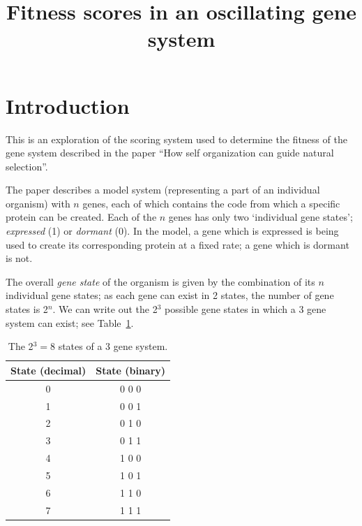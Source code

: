 \documentclass[11pt, a4paper]{article}
\title {
  Fitness scores in an oscillating gene system
}
\date{} %
\author{\Authors}
\begin{document}
\setlength{\droptitle}{-1.8cm} %
\maketitle

\vspace{-1.8cm} %

\section{Introduction}

This is an exploration of the scoring system used to determine the
fitness of the gene system described in the paper ``How self
organization can guide natural selection''.

The paper describes a model system (representing a part of an
individual organism) with $n$ genes, each of which contains the code
from which a specific protein can be created. Each of the $n$ genes
has only two `individual gene states'; \emph{expressed} (1)
or \emph{dormant} (0). In the model, a gene which is expressed is
being used to create its corresponding protein at a fixed rate; a gene
which is dormant is not.

The overall \emph{gene state} of the organism is given by the
combination of its $n$ individual gene states; as each gene can exist
in 2 states, the number of gene states is 2$^n$. We can write out the 2$^3$
possible gene states in which a 3 gene system can exist; see
Table~\ref{tab:states}.

\begin{table}[h!]
  \begin{center}
    \caption{The 2$^3 = \mathrm{8}$ states of a 3 gene system.}
    \label{tab:states}
    \begin{tabular}{c|c}
      \textbf{State (decimal)} & \textbf{State (binary)} \\
      \hline
      0 & 0 0 0\\
      1 & 0 0 1\\
      2 & 0 1 0\\
      3 & 0 1 1\\
      4 & 1 0 0\\
      5 & 1 0 1\\
      6 & 1 1 0\\
      7 & 1 1 1\\
    \end{tabular}
  \end{center}
\end{table}
\end{document}
